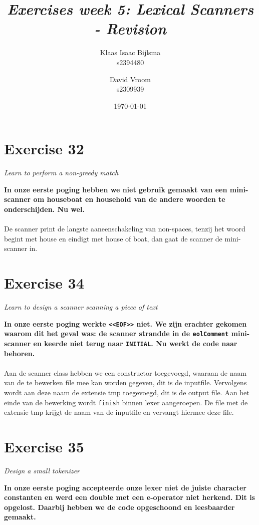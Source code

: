 \documentclass[12pt]{article}
\title{\itshape Exercises week 5: Lexical Scanners - Revision}
\author{
	Klaas Isaac Bijlsma \\ s2394480
	\and
	David Vroom \\ s2309939
}
\date{\today}
\newcommand{\desc}[1]{\textit{#1} \vspace{1em}}
\begin{document}
\maketitle

\section*{Exercise 32}
\desc{Learn to perform a non-greedy match}

\textbf{In onze eerste poging hebben we niet gebruik gemaakt van een mini-scanner om houseboat en household van de andere woorden te onderschijden. Nu wel.}\\
\\
De scanner print de langste aaneenschakeling van non-spaces, tenzij het woord begint met house en eindigt met house of boat, dan gaat de scanner de mini-scanner in. 



\clearpage

\section*{Exercise 34}
\desc{Learn to design a scanner scanning a piece of text}

\textbf{In onze eerste poging werkte \texttt{<<EOF>>} niet. We zijn erachter gekomen waarom dit het geval was: de scanner strandde in de \texttt{eolComment} mini-scanner en keerde niet terug naar \texttt{INITIAL}. Nu werkt de code naar behoren.}\\
\\
Aan de scanner class hebben we een constructor toegevoegd, waaraan de naam van de te bewerken file mee kan worden gegeven, dit is de inputfile. Vervolgens wordt aan deze naam de extensie tmp toegevoegd, dit is de output file. Aan het einde van de bewerking wordt \texttt{finish} binnen lexer aangeroepen. De file met de extensie tmp krijgt de naam van de inputfile en vervangt hiermee deze file.  





\clearpage

\section*{Exercise 35}
\desc{Design a small tokenizer}

\textbf{In onze eerste poging accepteerde onze lexer niet de juiste character constanten en werd een double met een e-operator niet herkend. Dit is opgelost. Daarbij hebben we de code opgeschoond en leesbaarder gemaakt.}





\clearpage
\end{document}
